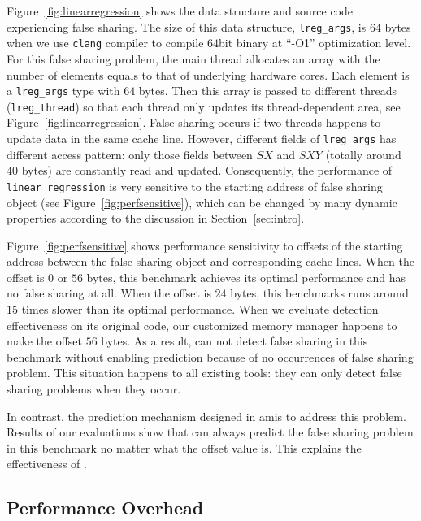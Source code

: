 Figure~\ref{fig:linearregression} shows the data structure and source code
experiencing false sharing.
The size of this data structure, \texttt{lreg\_args}, is $64$ bytes 
when we use \texttt{clang} compiler to compile $64$bit binary at ``-O1'' optimization level.
For this false sharing problem, the main thread allocates an array with the number of elements equals
to that of underlying hardware cores.
Each element is a \texttt{lreg\_args} type with $64$ bytes. 
Then this array is passed to different threads (\texttt{lreg\_thread}) 
so that each thread only updates its thread-dependent area, see Figure~\ref{fig:linearregression}.
False sharing occurs if two threads happens to update data in the same cache line. 
However, different fields of \texttt{lreg\_args} has different access pattern:
only those fields between $SX$ and $SXY$ (totally around $40$ bytes) are constantly read and updated.
Consequently, the performance of \texttt{linear\_regression} is very sensitive to 
the starting address of false sharing object (see Figure~\ref{fig:perfsensitive}),
which can be changed by many dynamic properties according
to the discussion in Section~\ref{sec:intro}.

Figure~\ref{fig:perfsensitive} shows performance sensitivity to 
offsets of the starting address between the false sharing object and corresponding cache lines. 
When the offset is $0$ or $56$ bytes, this benchmark achieves its optimal performance 
and has no false sharing at all.
When the offset is $24$ bytes, this benchmarks runs around $15$ times slower 
than its optimal performance.
When we eveluate detection effectiveness on its original code, 
our customized memory manager happens to make the offset $56$ bytes. 
As a result, \Predator{} can not detect false sharing in this benchmark 
without enabling prediction because of no occurrences of false sharing problem.
This situation happens to all existing tools: they can only detect false sharing problems when
they occur. 

In contrast, the prediction mechanism designed in \predator{} 
amis to address this problem.  Results of our evaluations show 
that \Predator{} can always predict the false sharing problem in this
benchmark no matter what the offset value is. 
This explains the effectiveness of \Predator{}.

\subsection{Performance Overhead}
\label{sec:perfoverhead}

